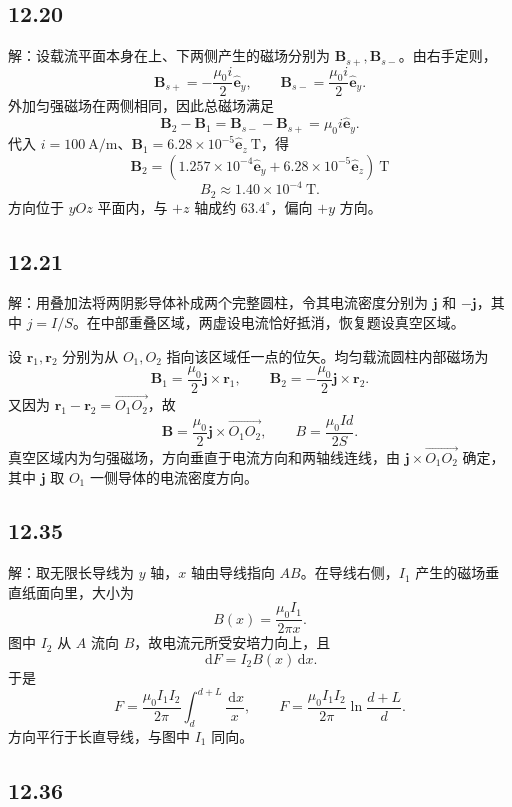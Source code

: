 \documentclass[UTF8,a4paper,12pt]{ctexart}
\newcommand{\dd}{\,\mathrm{d}}
\newcommand{\ez}{\hat{\bm e}_z}
\begin{document}
\subsection*{12.20}

解：设载流平面本身在上、下两侧产生的磁场分别为 $\bm B_{s+},\bm B_{s-}$。由右手定则，
\[
\bm B_{s+}=-\frac{\mu_0 i}{2}\hat{\bm e}_y,
\qquad
\bm B_{s-}=\frac{\mu_0 i}{2}\hat{\bm e}_y.
\]
外加匀强磁场在两侧相同，因此总磁场满足
\[
\bm B_2-\bm B_1=\bm B_{s-}-\bm B_{s+}
=\mu_0i\hat{\bm e}_y.
\]
代入 $i=100\ \mathrm{A/m}$、$\bm B_1=6.28\times10^{-5}\ez\ \mathrm{T}$，得
\[
\boxed{\bm B_2=
\left(1.257\times10^{-4}\hat{\bm e}_y
+6.28\times10^{-5}\ez\right)\ \mathrm{T}}
\]
\[
\boxed{B_2\approx1.40\times10^{-4}\ \mathrm{T}}.
\]
方向位于 $yOz$ 平面内，与 $+z$ 轴成约 $63.4^\circ$，偏向 $+y$ 方向。

\subsection*{12.21}

解：用叠加法将两阴影导体补成两个完整圆柱，令其电流密度分别为 $\bm j$ 和 $-\bm j$，其中 $j=I/S$。在中部重叠区域，两虚设电流恰好抵消，恢复题设真空区域。

设 $\bm r_1,\bm r_2$ 分别为从 $O_1,O_2$ 指向该区域任一点的位矢。均匀载流圆柱内部磁场为
\[
\bm B_1=\frac{\mu_0}{2}\bm j\times\bm r_1,
\qquad
\bm B_2=-\frac{\mu_0}{2}\bm j\times\bm r_2.
\]
又因为 $\bm r_1-\bm r_2=\overrightarrow{O_1O_2}$，故
\[
\boxed{\bm B=\frac{\mu_0}{2}\bm j\times\overrightarrow{O_1O_2}},
\qquad
\boxed{B=\frac{\mu_0Id}{2S}}.
\]
真空区域内为匀强磁场，方向垂直于电流方向和两轴线连线，由 $\bm j\times\overrightarrow{O_1O_2}$ 确定，其中 $\bm j$ 取 $O_1$ 一侧导体的电流密度方向。

\subsection*{12.35}

解：取无限长导线为 $y$ 轴，$x$ 轴由导线指向 $AB$。在导线右侧，$I_1$ 产生的磁场垂直纸面向里，大小为
\[
B(x)=\frac{\mu_0I_1}{2\pi x}.
\]
图中 $I_2$ 从 $A$ 流向 $B$，故电流元所受安培力向上，且
\[
\dd F=I_2B(x)\dd x.
\]
于是
\[
F=\frac{\mu_0I_1I_2}{2\pi}\int_d^{d+L}\frac{\dd x}{x},
\qquad
\boxed{F=\frac{\mu_0I_1I_2}{2\pi}\ln\!\frac{d+L}{d}}.
\]
方向平行于长直导线，与图中 $I_1$ 同向。

\subsection*{12.36}
\end{document}

